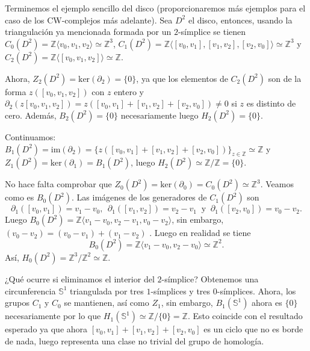 \bigskip

Terminemos el ejemplo sencillo del disco (proporcionaremos más ejemplos para el caso de los CW-complejos más adelante). Sea $D^2$ el disco, entonces, usando la triangulación ya mencionada formada por un $2$-símplice se tienen $C_0(D^2) = \mathbb{Z}\langle v_0, v_1, v_2 \rangle \simeq \mathbb{Z}^3$, $C_1(D^2)=\mathbb{Z}\langle [v_0,v_1],[v_1,v_2],[v_2,v_0] \rangle \simeq \mathbb{Z}^3$ y $C_2(D^2)=\mathbb{Z}\langle [v_0,v_1,v_2] \rangle \simeq \mathbb{Z}$. 
    
Ahora, $Z_2(D^2)= \text{ker}(\partial_2)=\{0\}$, ya que los elementos de $C_2(D^2)$ son de la forma $z([v_0,v_1,v_2])$ con $z$ entero y $\partial_2(z[v_0,v_1,v_2]) = z([v_0,v_1]+[v_1,v_2]+[v_2,v_0]) \neq 0$ si $z$ es distinto de cero. Además, $B_2(D^2) =\{0\}$ necesariamente luego $H_2(D^2)=\{0\}$.
    
Continuamos: $B_1(D^2)=\text{im}(\partial_2)=\{z([v_0,v_1]+[v_1,v_2]+[v_2,v_0])\}_{z\in\mathbb{Z}}\simeq \mathbb{Z}$ y $Z_1(D^2)= \text{ker}(\partial_1)=B_1(D^2)$, luego $H_2(D^2)\simeq \mathbb{Z}/\mathbb{Z} = \{0\}$.

No hace falta comprobar que $Z_0(D^2)=\text{ker}(\partial_0)=C_0(D^2)\simeq \mathbb{Z}^3$. Veamos como es $B_0(D^2)$. Las imágenes de los generadores de $C_1(D^2)$ son
\begin{equation*}
    \partial_1([v_0,v_1]) = v_1 - v_0,~~ \partial_1([v_1,v_2]) = v_2 - v_1~\text{ y }~ \partial_1([v_2,v_0]) = v_0 - v_2.
\end{equation*}
Luego $B_0(D^2)=\mathbb{Z}\langle v_1 - v_0, v_2 - v_1, v_0 - v_2 \rangle$, sin embargo, $(v_0 - v_2) = (v_0 - v_1) + (v_1 - v_2)$ . Luego en realidad se tiene
\begin{equation*}
    B_0(D^2)=\mathbb{Z}\langle v_1 - v_0, v_2 - v_0 \rangle \simeq \mathbb{Z}^2.
\end{equation*}
Así, $H_0(D^2)=\mathbb{Z}^3/\mathbb{Z}^2\simeq \mathbb{Z}$.

¿Qué ocurre si eliminamos el interior del $2$-símplice? Obtenemos una circunferencia $\mathbb{S}^1$ triangulada por tres $1$-símplices y tres $0$-símplices. Ahora, los grupos $C_1$ y $C_0$ se mantienen, así como $Z_1$, sin embargo, $B_1(\mathbb{S}^1)$ ahora es $\{0\}$ necesariamente por lo que $H_1(\mathbb{S}^1)\simeq\mathbb{Z}/\{0\} = \mathbb{Z}$. Esto coincide con el resultado esperado ya que ahora $[v_0,v_1]+[v_1,v_2]+[v_2,v_0]$ es un ciclo que no es borde de nada, luego representa una clase no trivial del grupo de homología.

\bigskip

